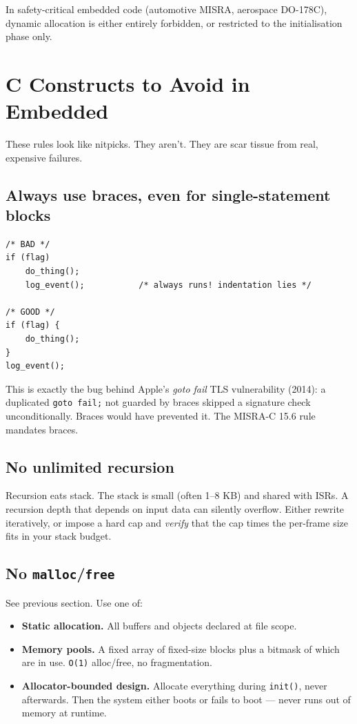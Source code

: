 \documentclass[11pt,a4paper]{article}
\begin{document}
\begin{keyidea}
In safety-critical embedded code (automotive MISRA, aerospace DO-178C),
dynamic allocation is either entirely forbidden, or restricted to the
initialisation phase only.
\end{keyidea}

\section{C Constructs to Avoid in Embedded}

These rules look like nitpicks. They aren't. They are scar tissue from
real, expensive failures.

\subsection{Always use braces, even for single-statement blocks}

\begin{lstlisting}[style=C]
/* BAD */
if (flag)
    do_thing();
    log_event();           /* always runs! indentation lies */

/* GOOD */
if (flag) {
    do_thing();
}
log_event();
\end{lstlisting}

This is exactly the bug behind Apple's \emph{goto fail} TLS vulnerability
(2014): a duplicated \texttt{goto fail;} not guarded by braces skipped a
signature check unconditionally. Braces would have prevented it.
The MISRA-C 15.6 rule mandates braces.

\subsection{No unlimited recursion}

Recursion eats stack. The stack is small (often 1--8 KB) and shared with
ISRs. A recursion depth that depends on input data can silently overflow.
Either rewrite iteratively, or impose a hard cap and \emph{verify} that
the cap times the per-frame size fits in your stack budget.

\subsection{No \texttt{malloc}/\texttt{free}}

See previous section. Use one of:
\begin{itemize}[leftmargin=*]
    \item \textbf{Static allocation.} All buffers and objects declared at
    file scope.
    \item \textbf{Memory pools.} A fixed array of fixed-size blocks plus a
    bitmask of which are in use. \texttt{O(1)} alloc/free, no fragmentation.
    \item \textbf{Allocator-bounded design.} Allocate everything during
    \texttt{init()}, never afterwards. Then the system either boots or
    fails to boot --- never runs out of memory at runtime.
\end{itemize}
\end{document}
